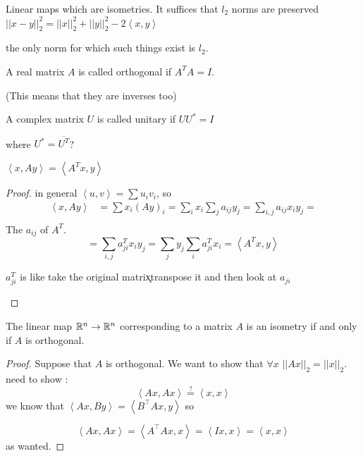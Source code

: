 Linear maps which are isometries. It suffices that $l_{2}$ norms
are preserved $\left|\left|x-y\right|\right|_{2}^{2}=\left|\left|x\right|\right|_{2}^{2}+\left|\left|y\right|\right|_{2}^{2}-2\left\langle x,y\right\rangle $
\begin{insight}
the only norm for which such things exist is $l_{2}$.%
\end{insight}

\begin{definition}
A real matrix $A$ is called orthogonal if $A^{T}A=I$.

\begin{insight}
(This means that they are inverses too)%
\end{insight}

\end{definition}

\begin{definition}
A complex matrix $U$ is called unitary if $UU^{*}=I$ %
\begin{insight}
where $U^{*}=\overline{U^{T}}$?%
\end{insight}
\end{definition}

\begin{claim}
$\left\langle x,Ay\right\rangle =\left\langle A^{T}x,y\right\rangle $
\begin{proof}
in general $\left\langle u,v\right\rangle =\sum u_{i}v_{i}$, so
\begin{align*}
\left\langle x,Ay\right\rangle  & =\sum x_{i}\left(Ay\right)_{i}=\sum_{i}x_{i}\sum_{j}a_{ij}y_{j}=\sum_{i,j}a_{ij}x_{i}y_{j}=\\
\end{align*}
 The $a_{ij}$ of $A^{T}$.
\[
=\sum_{i,j}a_{ji}^{T}x_{i}y_{j}=\sum_{j}y_{j}\sum_{i}a_{ji}^{T}x_{i}=\left\langle A^{T}x,y\right\rangle 
\]
\begin{insight}
$a_{ji}^{T}$ is like take the original matrix\c{ }transpose it and
then look at $a_{ji}$%
\end{insight}
\end{proof}
\end{claim}

\begin{thm}
The linear map $\mathbb{R}^{n}\to\mathbb{R}^{n}$ corresponding to a matrix $A$ is
an isometry if and only if $A$ is orthogonal.
\begin{proof}
Suppose that $A$ is orthogonal. We want to show that $\forall x$
$\left|\left|Ax\right|\right|_{2}=\left|\left|x\right|\right|_{2}$.
need to show :
\[
\left\langle Ax,Ax\right\rangle \overset{?}{=}\left\langle x,x\right\rangle 
\]
we know that $\left\langle Ax,By\right\rangle =\left\langle B^{\top}Ax,y\right\rangle $
so

\[
\left\langle Ax,Ax\right\rangle =\left\langle A^{\top}Ax,x\right\rangle =\left\langle Ix,x\right\rangle =\left\langle x,x\right\rangle 
\]
 as wanted.
\end{proof}
\end{thm}

